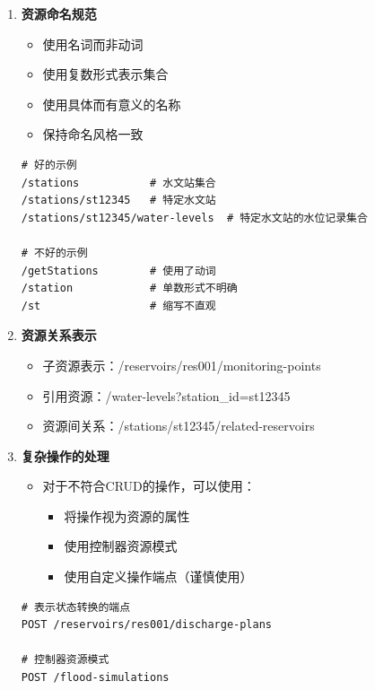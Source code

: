 \begin{enumerate}
\def\labelenumi{\arabic{enumi}.}
\tightlist
\item
  \textbf{资源命名规范}

  \begin{itemize}
  \tightlist
  \item
    使用名词而非动词
  \item
    使用复数形式表示集合
  \item
    使用具体而有意义的名称
  \item
    保持命名风格一致
  \end{itemize}

\begin{lstlisting}
# 好的示例
/stations           # 水文站集合
/stations/st12345   # 特定水文站
/stations/st12345/water-levels  # 特定水文站的水位记录集合

# 不好的示例
/getStations        # 使用了动词
/station            # 单数形式不明确
/st                 # 缩写不直观
\end{lstlisting}
\item
  \textbf{资源关系表示}

  \begin{itemize}
  \tightlist
  \item
    子资源表示：/reservoirs/res001/monitoring-points
  \item
    引用资源：/water-levels?station\_id=st12345
  \item
    资源间关系：/stations/st12345/related-reservoirs
  \end{itemize}
\item
  \textbf{复杂操作的处理}

  \begin{itemize}
  \tightlist
  \item
    对于不符合CRUD的操作，可以使用：

    \begin{itemize}
    \tightlist
    \item
      将操作视为资源的属性
    \item
      使用控制器资源模式
    \item
      使用自定义操作端点（谨慎使用）
    \end{itemize}
  \end{itemize}

\begin{lstlisting}
# 表示状态转换的端点
POST /reservoirs/res001/discharge-plans

# 控制器资源模式
POST /flood-simulations
\end{lstlisting}
\end{enumerate}

